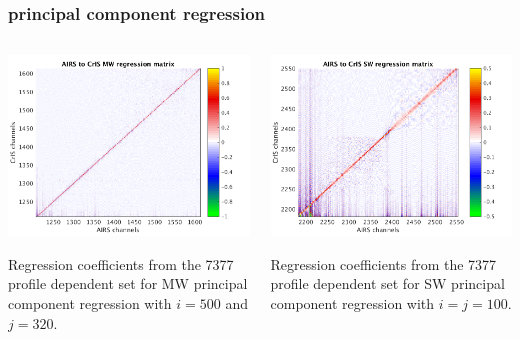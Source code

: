 \documentclass[10pt]{beamer}
\begin{document}
\begin{frame}
\frametitle{principal component regression}
\begin{columns}[t]
\begin{column}{0.5\textwidth}
  \begin{centering}
  \includegraphics[width=\textwidth]{slackfigs/MW_pc_regr_mat.png}
  \end{centering}\vspace{3mm}
  Regression coefficients from the 7377 profile dependent set for
  MW principal component regression with $i = 500$ and $j = 320$.
 
\end{column}
\begin{column}{0.5\textwidth}  
  \begin{centering}
  \includegraphics[width=\textwidth]{slackfigs/SW_pc_regr_mat.png}
  \end{centering}\vspace{3mm}
  Regression coefficients from the 7377 profile dependent set for
  SW principal component regression with $i = j = 100$.

\end{column}
\end{columns}
\end{frame}
\end{document}
